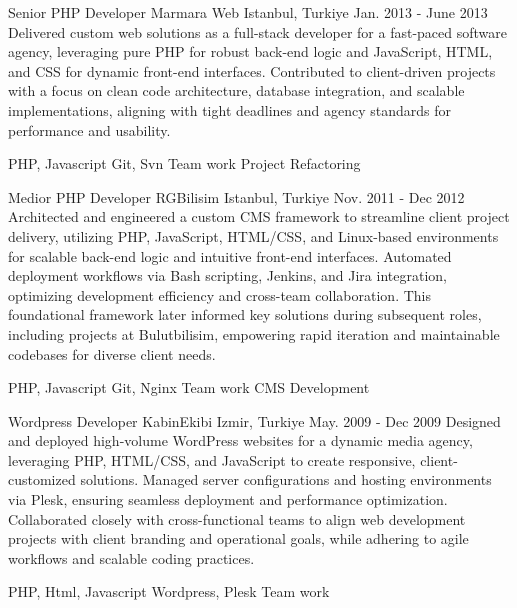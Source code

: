 \begin{cventries}
    \cventry
    {Senior PHP Developer} %
    {Marmara Web} %
    {Istanbul, Turkiye} %
    {Jan. 2013 - June 2013} %
    {
      Delivered custom web solutions as a full-stack developer for a fast-paced software agency, leveraging pure PHP for robust back-end logic and JavaScript, HTML, and CSS for dynamic front-end interfaces. Contributed to client-driven projects with a focus on clean code architecture, database integration, and scalable implementations, aligning with tight deadlines and agency standards for performance and usability.
    }
    {
      \begin{cvsubentries}%
        \cvsubentry {} {PHP, Javascript} {} {} 
        \cvsubentry {} {Git, Svn} {} {} 
        \cvsubentry {} {Team work} {} {} 
        \cvsubentry {} {Project Refactoring} {} {} 
      \end{cvsubentries}
    }

    \cventry
    {Medior PHP Developer} %
    {RGBilisim} %
    {Istanbul, Turkiye} %
    {Nov. 2011 - Dec 2012} %
    {
      Architected and engineered a custom CMS framework to streamline client project delivery, utilizing PHP, JavaScript, HTML/CSS, and Linux-based environments for scalable back-end logic and intuitive front-end interfaces. Automated deployment workflows via Bash scripting, Jenkins, and Jira integration, optimizing development efficiency and cross-team collaboration. This foundational framework later informed key solutions during subsequent roles, including projects at Bulutbilisim, empowering rapid iteration and maintainable codebases for diverse client needs.
    }
    {
      \begin{cvsubentries}%
        \cvsubentry {} {PHP, Javascript} {} {} 
        \cvsubentry {} {Git, Nginx} {} {} 
        \cvsubentry {} {Team work} {} {} 
        \cvsubentry {} {CMS Development} {} {} 
      \end{cvsubentries}
    }

    \cventry
    {Wordpress Developer} %
    {KabinEkibi} %
    {Izmir, Turkiye} %
    {May. 2009 - Dec 2009} %
    {
      Designed and deployed high-volume WordPress websites for a dynamic media agency, leveraging PHP, HTML/CSS, and JavaScript to create responsive, client-customized solutions. Managed server configurations and hosting environments via Plesk, ensuring seamless deployment and performance optimization. Collaborated closely with cross-functional teams to align web development projects with client branding and operational goals, while adhering to agile workflows and scalable coding practices.
    }
    {
      \begin{cvsubentries}%
        \cvsubentry {} {PHP, Html, Javascript} {} {} 
        \cvsubentry {} {Wordpress, Plesk} {} {} 
        \cvsubentry {} {Team work} {} {} 
      \end{cvsubentries}
    }


\end{cventries}
